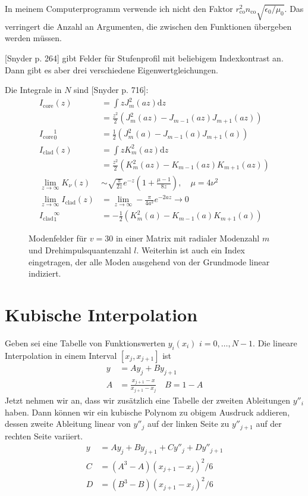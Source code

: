 \documentclass[DIV19,twocolumn]{scrartcl}
\def\({\left(}
\def\){\right)}
\newcommand{\nco}{n_\textrm{co}}
\newcommand{\rco}{r_\textrm{co}}
\def\svgending{\ifx\pdfoutput\undefined%
  .eps_tex%
  \else%
  .pdf_tex%
  \fi}
\newcommand{\svginput}[2]{{\def\svgscale{#1}}}
\begin{document}
In meinem Computerprogramm verwende ich nicht den Faktor $\rco^2 \nco
\sqrt{\epsilon_0/\mu_0}$. Das verringert die Anzahl an Argumenten, die
zwischen den Funktionen \"ubergeben werden m\"ussen.

[Snyder p. 264] gibt Felder f\"ur Stufenprofil mit beliebigem
Indexkontrast an. Dann gibt es aber drei verschiedene
Eigenwertgleichungen.

Die Integrale in $N$ sind [Snyder p. 716]: 
\begin{align}
  I_\textrm{core}(z) &= \int z J_m^2(az) \textrm{d} z \\&= \frac{z^2}{2}(J_m^2(az)-J_{m-1}(az)J_{m+1}(az))\\
  I_\textrm{core} {}^1_0 &= \frac{1}{2}(J_m^2(a)-J_{m-1}(a)J_{m+1}(a)) \\
  I_\textrm{clad}(z) &= \int z K_m^2(az) \textrm{d} z \\&= \frac{z^2}{2}(K_m^2(az)-K_{m-1}(az)K_{m+1}(az)) \\
  \lim_{z\rightarrow \infty} K_\nu(z) &\sim \sqrt{\frac{\pi}{2z}} e^{-z}\(1+\frac{\mu-1}{8z}\), \quad \mu=4\nu^2 \\ %
  \lim_{z\rightarrow \infty} I_\textrm{clad}(z)  & = \lim_{z\rightarrow \infty} -\frac{\pi}{4a^2}e^{-2az} \rightarrow 0 \\
  I_\textrm{clad} {}^\infty_1 &= -\frac{1}{2}(K_m^2(a)-K_{m-1}(a)K_{m+1}(a)) 
\end{align}


\begin{figure}[hbtp]
  \centering
  \svginput{1}{modes}
  \caption{Modenfelder f\"ur $v=30$ in einer Matrix mit radialer
    Modenzahl $m$ und Drehimpulsquantenzahl $l$. Weiterhin ist auch
    ein Index eingetragen, der alle Moden ausgehend von der Grundmode
    linear indiziert.}
  \label{fig:fields}
\end{figure}
\section{Kubische Interpolation}
Geben sei eine Tabelle von Funktionswerten $y_i(x_i)$
$i=0,\ldots,N-1$. Die lineare Interpolation in einem Interval
$[x_j,x_{j+1}]$ ist
\begin{align}
  y &= Ay_j + By_{j+1} \\
  A &= \frac{x_{j+1}-x}{x_{j+1}-x_j}\quad B=1-A
\end{align}
Jetzt nehmen wir an, dass wir zus\"atzlich eine Tabelle der zweiten
Ableitungen $y''_i$ haben. Dann k\"onnen wir ein kubische Polynom zu
obigem Ausdruck addieren, dessen zweite Ableitung linear von $y''_j$
auf der linken Seite zu $y''_{j+1}$ auf der rechten Seite variiert.
\begin{align}
  y &= Ay_j + By_{j+1} + Cy''_j + Dy''_{j+1} \\
  C &= (A^3-A)(x_{j+1}-x_j)^2/6 \\
  D &= (B^3-B)(x_{j+1}-x_j)^2/6 
\end{align}
\end{document}
